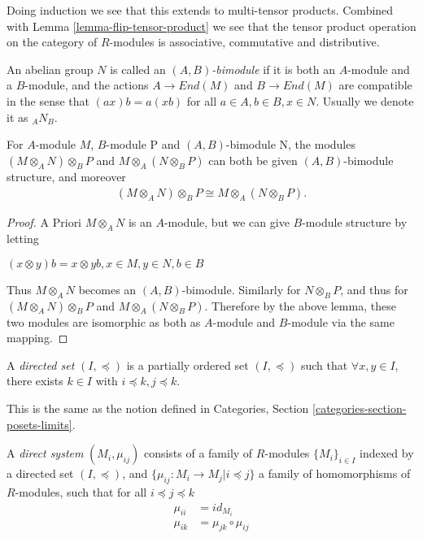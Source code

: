 \noindent
Doing induction we see that this extends to multi-tensor products. Combined 
with Lemma \ref{lemma-flip-tensor-product} we see that
the tensor product operation on the category of $R$-modules is associative, 
commutative and distributive.

\begin{definition}
\label{definition-bimodule}
An abelian group $N$ is called an {\it $(A,B)$-bimodule} if it is both an 
$A$-module and a $B$-module, and
the actions $A\rightarrow End(M)$ and $B\rightarrow End(M)$
are compatible in the sense that $(ax)b=a(xb)$ for all
$a\in A, b\in B, x\in N$. Usually we denote it as $_{A}N_{B}$.
\end{definition}

\begin{lemma}
\label{lemma-tensor-with-bimodule}
For $A$-module $M$, $B$-module P and $(A,B)$-bimodule N, the modules
$(M\otimes_{A}N)\otimes_{B}P$ and $M\otimes_{A}(N\otimes_{B}P)$ can both be 
given $(A,B)$-bimodule structure,
and moreover
\begin{align}
(M\otimes_{A}N)\otimes_{B}P \cong M\otimes_{A}(N\otimes_{B}P).
\end{align}
\end{lemma}

\begin{proof}
A Priori $M\otimes_A N$ is an $A$-module, but we can give $B$-module structure 
by letting
\begin{center}
$(x\otimes y)b=x\otimes yb, x\in M, y\in N, b\in B$
\end{center}
Thus $M\otimes_A N$ becomes an $(A,B)$-bimodule. Similarly for $N\otimes_B P$, 
and thus for
$(M\otimes_{A}N)\otimes_{B}P$ and $M\otimes_{A}(N\otimes_{B}P)$. Therefore by 
the above lemma, these two
modules are isomorphic as both as $A$-module and $B$-module via the same 
mapping.
\end{proof}

\begin{definition}
\label{definition-directed-set}
A {\it directed set} $(I,\preceq)$
is a partially ordered set $(I,\preceq)$ such that 
$\forall x,y\in I$, there exists
$k\in I$ with $i\preceq k, j\preceq k$.
\end{definition}

\noindent
This is the same as the notion defined in Categories,
Section \ref{categories-section-posets-limits}.

\begin{definition}
\label{definiton-directed-system}
A {\it direct system} $(M_i, \mu_{ij})$ consists of a family of 
$R$-modules $\{M_i\}_{i\in I}$ indexed
by a directed set $(I,\preceq)$,
and $\{\mu_{ij}:M_{i}\rightarrow M_{j}| i\preceq j\}$ 
a family of homomorphisms of
$R$-modules, such that for all $i \preceq j \preceq k$
\begin{align}
\mu_{ii} &= id_{M_i}\\
\mu_{ik} &= \mu_{jk}\circ \mu_{ij}
\end{align}
\end{definition}

